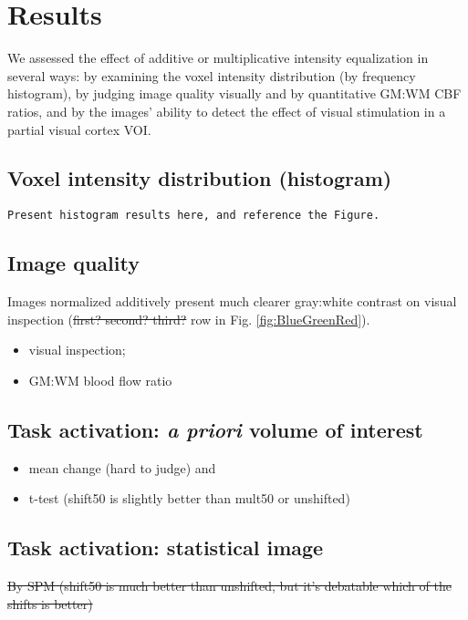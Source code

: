 \section{Results}
We assessed the effect of additive or multiplicative intensity equalization in several ways: by examining the voxel intensity distribution (by frequency histogram), by judging image quality visually and by quantitative GM:WM CBF ratios, and by the images' ability to detect the effect of visual stimulation in a partial visual cortex VOI. 

\subsection{Voxel intensity distribution (histogram)}
\verb|Present histogram results here, and reference the Figure.|

\subsection{Image quality}
Images normalized additively present much clearer gray:white contrast on visual inspection (\sout{first? second? third?} row in Fig. \ref{fig:BlueGreenRed}). 
  \begin{itemize}
  \item visual inspection;
  \item GM:WM blood flow ratio
  \end{itemize}

\subsection{Task activation: \textit{a priori} volume of interest}
  \begin{itemize} 
    \item mean change (hard to judge) and 
    \item t-test (shift50 is slightly better than mult50 or unshifted)
  \end{itemize}

\subsection{Task activation: statistical image}
\sout{By SPM (shift50 is much better than unshifted, but it's debatable which of the shifts is better)}

